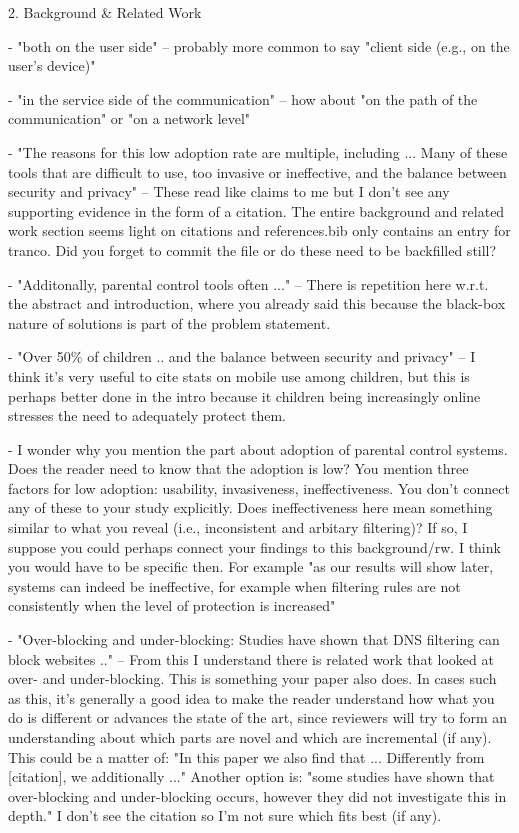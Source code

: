 
2. Background & Related Work

- "both on the user side" -- probably more common to say "client side (e.g., on the user's device)"

- "in the service side of the communication" -- how about "on the path of the communication" or "on a network level"

- "The reasons for this low adoption rate are multiple, including ... Many of these tools that are difficult to use, too invasive or ineffective, and the balance between security and privacy" -- These read like claims to me but I don't see any supporting evidence in the form of a citation. The entire background and related work section seems light on citations and references.bib only contains an entry for tranco. Did you forget to commit the file or do these need to be backfilled still?

- "Additonally, parental control tools often ..." -- There is repetition here w.r.t. the abstract and introduction, where you already said this because the black-box nature of solutions is part of the problem statement.  

- "Over 50\% of children .. and the balance between security and privacy" -- I think it's very useful to cite stats on mobile use among children, but this is perhaps better done in the intro because it children being increasingly online stresses the need to adequately protect them.

- I wonder why you mention the part about adoption of parental control systems. Does the reader need to know that the adoption is low? You mention three factors for low adoption: usability, invasiveness, ineffectiveness. You don't connect any of these to your study explicitly. Does ineffectiveness here mean something similar to what you reveal (i.e., inconsistent and arbitary filtering)? If so, I suppose you could perhaps connect your findings to this background/rw. I think you would have to be specific then. For example "as our results will show later, systems can indeed be ineffective, for example when filtering rules are not consistently when the level of protection is increased"  

- "Over-blocking and under-blocking: Studies have shown that DNS filtering can block websites .." -- From this I understand there is related work that looked at over- and under-blocking. This is something your paper also does. In cases such as this, it's generally a good idea to make the reader understand how what you do is different or advances the state of the art, since reviewers will try to form an understanding about which parts are novel and which are incremental (if any). This could be a matter of: "In this paper we also find that ... Differently from [citation], we additionally ..." Another option is: "some studies have shown that over-blocking and under-blocking occurs, however they did not investigate this in depth." I don't see the citation so I'm not sure which fits best (if any).

